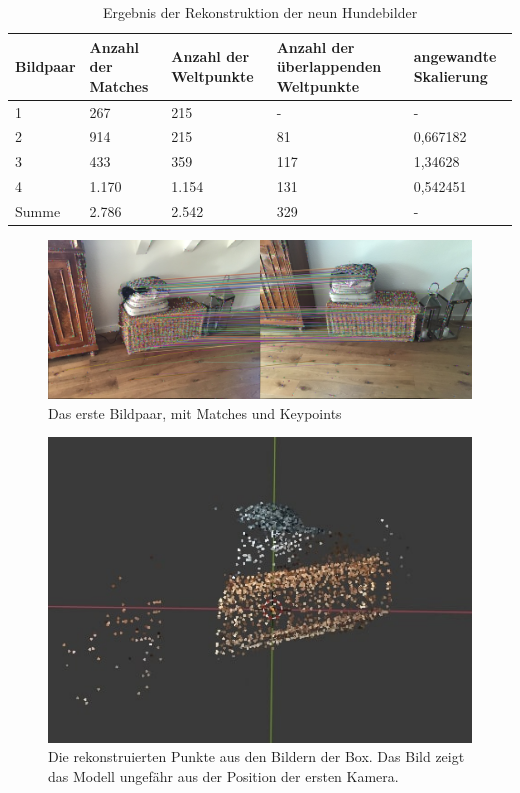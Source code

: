 \begin{table}
    \begin{tabularx}{\textwidth}{XXXXX}
        \toprule
        Bildpaar &  Anzahl der Matches & Anzahl der Weltpunkte & Anzahl der überlappenden Weltpunkte & angewandte Skalierung \\ 
        \midrule
        1 & 267 & 215 & -  & - \\
        2 & 914 & 215 & 81 & 0,667182 \\
        3 & 433 & 359 & 117 & 1,34628 \\
        4 & 1.170 & 1.154 & 131 & 0,542451 \\
        \midrule
        Summe & 2.786 & 2.542 & 329 & - \\
        \bottomrule
    \end{tabularx}
    \caption{Ergebnis der Rekonstruktion der neun Hundebilder}
    \label{tab:box-results}
\end{table}

\begin{figure}
    \includegraphics[width=\textwidth]{src/img/box_first_pair_with_matches.jpg}
    \caption{Das erste Bildpaar, mit Matches und Keypoints}
    \label{fig:box-first-pair-with-matches}
\end{figure}

\begin{figure}
    \includegraphics[width=\textwidth]{src/img/box_model.jpg}
    \caption{Die rekonstruierten Punkte aus den Bildern der Box. Das Bild zeigt das Modell ungefähr aus der Position der ersten Kamera.}
    \label{fig:box-model}
\end{figure}

